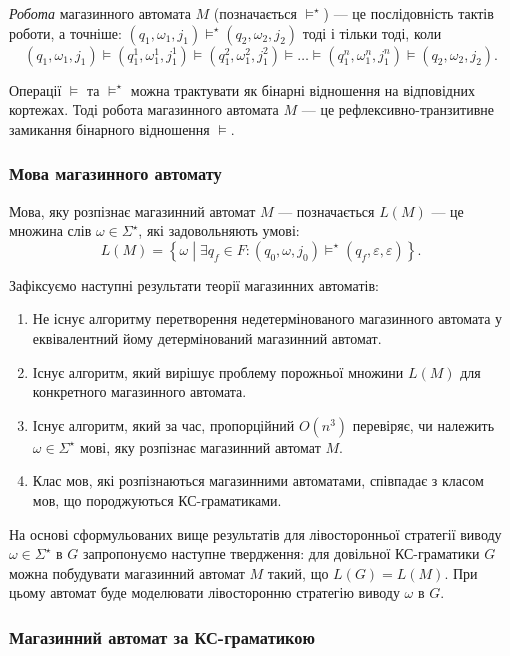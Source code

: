 \textit{Робота} магазинного автомата $M$ (позначається $\models^\star$) --- це послідовність тактів роботи, а точніше: $(q_1, \omega_1, j_1) \models^\star (q_2, \omega_2, j_2)$ тоді і тільки тоді, коли
\[ (q_1, \omega_1, j_1) \models (q_1^1, \omega_1^1, j_1^1) \models (q_1^2, \omega_1^2, j_1^2) \models \ldots \models (q_1^n, \omega_1^n, j_1^n) \models (q_2, \omega_2, j_2). \]

Операції $\models$ та $\models^\star$ можна трактувати як бінарні відношення на відповідних кортежах. Тоді робота магазинного автомата $M$ --- це рефлексивно-транзитивне замикання бінарного відношення $\models$.

\subsubsection{Мова магазинного автомату}

Мова, яку розпізнає магазинний автомат $M$ --- позначається $L(M)$ --- це множина слів $\omega \in \Sigma^\star$, які задовольняють умові:
\[ L(M) = \left\{ \omega \middle| \exists q_f \in F: (q_0, \omega, j_0) \models^\star (q_f, \varepsilon, \varepsilon) \right\}.\]

Зафіксуємо наступні результати теорії магазинних автоматів:
\begin{enumerate}
	\item Не існує алгоритму перетворення недетермінованого магазинного автомата у еквівалентний йому детермінований магазинний автомат.
	\item Існує алгоритм, який вирішує проблему порожньої множини $L(M)$ для конкретного магазинного автомата.
	\item Існує алгоритм, який за час, пропорційний $O(n^3)$ перевіряє, чи належить $\omega \in \Sigma^\star$ мові, яку розпізнає магазинний автомат $M$.
	\item Клас мов, які розпізнаються магазинними автоматами, співпадає з класом мов, що породжуються КС-граматиками.
\end{enumerate}

На основі сформульованих вище результатів для лівосторонньої стратегії виводу $\omega \in \Sigma^\star$ в $G$ запропонуємо наступне твердження: для довільної КС-граматики $G$ можна побудувати магазинний автомат $M$ такий, що $L(G) = L(M)$. При цьому автомат буде моделювати лівосторонню стратегію виводу $\omega$ в $G$.

\subsubsection{Магазинний автомат за КС-граматикою}

